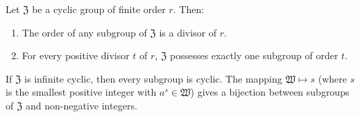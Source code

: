 Let $\mathfrak{Z}$ be a cyclic group of finite order $r$. Then:

\begin{enumerate}
\item The order of any subgroup of $\mathfrak{Z}$ is a divisor of $r$.
\item For every positive divisor $t$ of $r$, $\mathfrak{Z}$ possesses exactly one subgroup of order $t$.
\end{enumerate}

If $\mathfrak{Z}$ is infinite cyclic, then every subgroup is cyclic. The mapping $\mathfrak{W} \mapsto s$ (where $s$ is the smallest positive integer with $a^s \in \mathfrak{W}$) gives a bijection between subgroups of $\mathfrak{Z}$ and non-negative integers.
